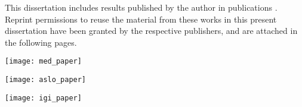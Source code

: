 %
%

This dissertation includes results published by the author in publications \cite{prasanna_med, prasanna_igi, prasanna_aslo}. Reprint permissions to reuse the material from these works in this present dissertation have been granted by the respective publishers, and are attached in the following pages.

\begin{minipage}{\textwidth}
 \centering
 \texttt{[image: med\_paper]}
\end{minipage}

\begin{minipage}{\textwidth}
 \centering
 \texttt{[image: aslo\_paper]}
\end{minipage}

\begin{minipage}{\textwidth}
 \centering
 \texttt{[image: igi\_paper]}
\end{minipage}

